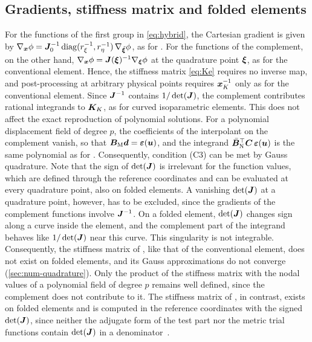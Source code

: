 \subsection{Gradients, stiffness matrix and folded elements}
\label{sec:hybrid-gradients}
%
For the functions of the first group in \cref{eq:hybrid}, the Cartesian gradient is given by $\nabla_{\bm{x}}\phi=\bm{J}_0^{-1}\operatorname{diag}(r_{\xi}^{-1},r_{\eta}^{-1})\,\nabla_{\tilde{\bm\xi}}\phi$, as for \PM. For the functions of the complement, on the other hand, $\nabla_{\bm{x}}\phi=\bm{J}(\bm\xi)^{-1}\nabla_{\bm\xi}\phi$ at the quadrature point $\bm\xi$, as for the conventional element. Hence, the stiffness matrix \cref{eq:Ke} requires no inverse map, and post-processing at arbitrary physical points requires $\bm{x}_K^{-1}$ only as for the conventional element. Since $\bm{J}^{-1}$ contains $1/\det(\bm{J})$, the complement contributes rational integrands to $\bm{K}_K$, as for curved isoparametric elements. This does not affect the exact reproduction of polynomial solutions. For a polynomial displacement field of degree $p$, the coefficients of the interpolant on the complement vanish, so that $\bm{B}_{\mathrm M}\bm{d}=\bm\varepsilon(\bm{u})$, and the integrand $\bar{\bm{B}}_{\mathrm N}^\top\bm{C}\,\bm\varepsilon(\bm{u})$ is the same polynomial as for \PM. Consequently, condition (C3) can be met by Gauss quadrature. Note that the sign of $\det(\bm{J})$ is irrelevant for the function values, which are defined through the reference coordinates and can be evaluated at every quadrature point, also on folded elements. A vanishing $\det(\bm{J})$ at a quadrature point, however, has to be excluded, since the gradients of the complement functions involve $\bm{J}^{-1}$. On a folded element, $\det(\bm{J})$ changes sign along a curve inside the element, and the complement part of the integrand behaves like $1/\det(\bm{J})$ near this curve. This singularity is not integrable. Consequently, the stiffness matrix of \PH, like that of the conventional element, does not exist on folded elements, and its Gauss approximations do not converge (\cref{sec:num-quadrature}). Only the product of the stiffness matrix with the nodal values of a polynomial field of degree $p$ remains well defined, since the complement does not contribute to it. The stiffness matrix of \PM, in contrast, exists on folded elements and is computed in the reference coordinates with the signed $\det(\bm{J})$, since neither the adjugate form of the test part nor the metric trial functions contain $\det(\bm{J})$ in a denominator~\cite{Rajendran2010technique}.
